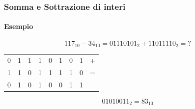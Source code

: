 \documentclass{beamer}
\begin{document}
  \begin{frame}
	    \frametitle{Somma e Sottrazione di interi}
	    \framesubtitle{Esempio}
	    $$117_{10} - 34_{10} = 01110101_{2} + 11011110_{2} = \text{?}$$
	    \vspace{2em}
	    \pause
			\begin{center}
			\begin{tabular}{cccccccc|c} 
			 0 & 1 & 1 & 1 & 0 & 1 & 0 & 1 & + \\  
			 1 & 1 & 0 & 1 & 1 & 1 & 1 & 0 & = \\ 
			\hline 
			 0 & 1 & 0 & 1 & 0 & 0 & 1 & 1 &  \\ 
			\end{tabular}
			\end{center}
			\pause
			\vspace{2em}
			$$01010011_{2} = 83_{10}$$
	  \end{frame}
\end{document}
